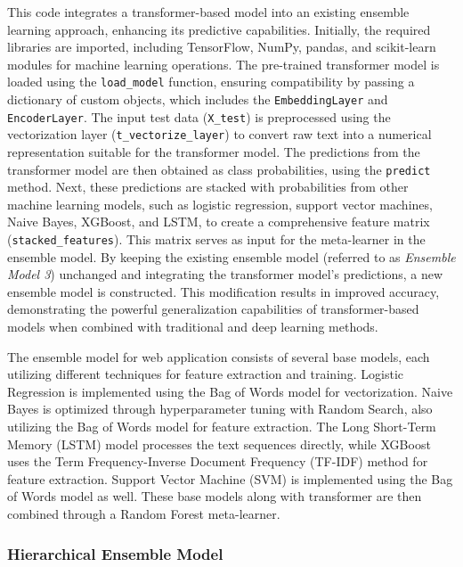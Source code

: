 \noindent
This code integrates a transformer-based model into an existing ensemble learning approach, enhancing its predictive capabilities. Initially, the required libraries are imported, including TensorFlow, NumPy, pandas, and scikit-learn modules for machine learning operations. The pre-trained transformer model is loaded using the \texttt{load\_model} function, ensuring compatibility by passing a dictionary of custom objects, which includes the \texttt{EmbeddingLayer} and \texttt{EncoderLayer}. The input test data (\texttt{X\_test}) is preprocessed using the vectorization layer (\texttt{t\_vectorize\_layer}) to convert raw text into a numerical representation suitable for the transformer model. The predictions from the transformer model are then obtained as class probabilities, using the \texttt{predict} method. Next, these predictions are stacked with probabilities from other machine learning models, such as logistic regression, support vector machines, Naive Bayes, XGBoost, and LSTM, to create a comprehensive feature matrix (\texttt{stacked\_features}). This matrix serves as input for the meta-learner in the ensemble model. By keeping the existing ensemble model (referred to as \textit{Ensemble Model 3}) unchanged and integrating the transformer model's predictions, a new ensemble model is constructed. This modification results in improved accuracy, demonstrating the powerful generalization capabilities of transformer-based models when combined with traditional and deep learning methods.

\vspace{1em}

\noindent
The ensemble model for web application consists of several base models, each utilizing different techniques for feature extraction and training. Logistic Regression is implemented using the Bag of Words model for vectorization. Naive Bayes is optimized through hyperparameter tuning with Random Search, also utilizing the Bag of Words model for feature extraction. The Long Short-Term Memory (LSTM) model processes the text sequences directly, while XGBoost uses the Term Frequency-Inverse Document Frequency (TF-IDF) method for feature extraction. Support Vector Machine (SVM) is implemented using the Bag of Words model as well. These base models along with transformer are then combined through a Random Forest meta-learner.


\subsubsection{Hierarchical Ensemble Model}

